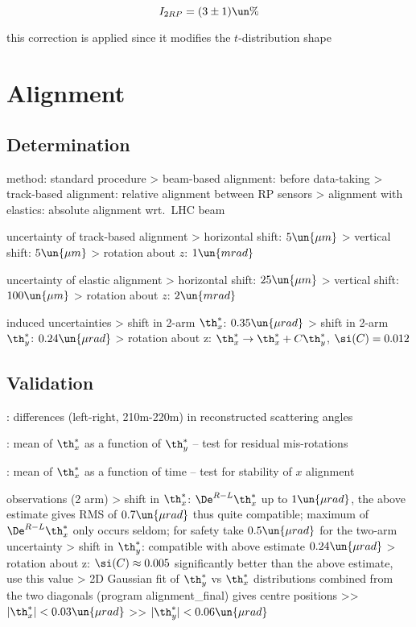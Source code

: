 $$I_{2RP} = (3 \pm 1)\un{\%}$$

\> this correction is applied since it modifies the $t$-distribution shape



\section{Alignment}

\subsection{Determination}

\> method: standard procedure
\>> beam-based alignment: before data-taking
\>> track-based alignment: relative alignment between RP sensors
\>> alignment with elastics: absolute alignment wrt.~LHC beam

\> uncertainty of track-based alignment
\>> horizontal shift: $5\un{\mu m}$
\>> vertical shift: $5\un{\mu m}$
\>> rotation about $z$: $1\un{mrad}$

\> uncertainty of elastic alignment
\>> horizontal shift: $25\un{\mu m}$
\>> vertical shift: $100\un{\mu m}$
\>> rotation about $z$: $2\un{mrad}$

\> induced uncertainties
\>> shift in 2-arm $\th_x^*$: $0.35\un{\mu rad}$
\>> shift in 2-arm $\th_y^*$: $0.24\un{\mu rad}$
\>> rotation about z: $\th_x^* \rightarrow \th_x^* + C \th_y^*$, $\si(C) = 0.012$

\subsection{Validation}

\> : differences (left-right, 210m-220m) in reconstructed scattering angles

\> : mean of $\th_x^*$ as a function of $\th_y^*$ -- test for residual mis-rotations

\> :  mean of $\th_x^*$ as a function of time -- test for stability of $x$ alignment

\> observations (2 arm)
\>> shift in $\th_x^*$: $\De^{R-L} \th_x^*$ up to $1\un{\mu rad}$, the above estimate gives RMS of $0.7\un{\mu rad}$ thus quite compatible; maximum of $\De^{R-L} \th_x^*$ only occurs seldom; for safety take $0.5\un{\mu rad}$ for the two-arm uncertainty
\>> shift in $\th_y^*$: compatible with above estimate $0.24\un{\mu rad}$
\>> rotation about z: $\si(C) \approx 0.005$ significantly better than the above estimate, use this value
\>> 2D Gaussian fit of $\th^*_y$ vs $\th^*_x$ distributions combined from the two diagonals (program alignment\_final) gives centre positions
\>>> $|\th^*_x| < 0.03\un{\mu rad}$
\>>> $|\th^*_y| < 0.06\un{\mu rad}$


